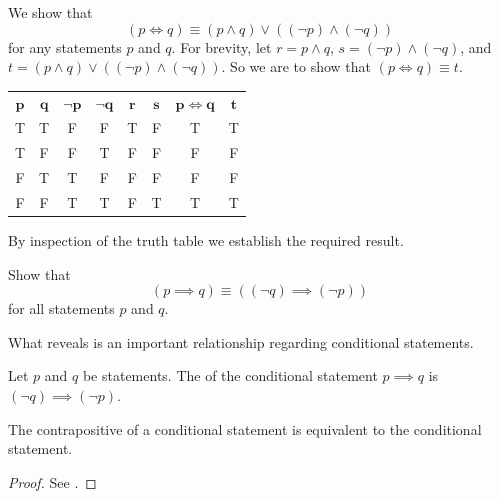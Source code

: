 \begin{example}
    We show that
    \[
        (p \iff q) \equiv (p \land q) \lor ((\lnot p) \land (\lnot q))
    \]
    for any statements $p$ and $q$. For brevity, let $r = p \land q$, $s = (\lnot p) \land (\lnot q)$, and $t = (p \land q) \lor ((\lnot p) \land (\lnot q))$. So we are to show that $(p \iff q) \equiv t$.
    \begin{table}[H]
        \centering
        \begin{tabular}{|c|c||c|c|c|c||c|c|}
            \hline
            $\boldsymbol{p}$ & $\boldsymbol{q}$ & $\boldsymbol{\lnot p}$ & $\boldsymbol{\lnot q}$ & $\boldsymbol{r}$ & $\boldsymbol{s}$ & $\boldsymbol{p \iff q}$ & $\boldsymbol{t}$ \\ \hhline{|=|=#=|=|=|=#=|=|}
            T & T & F & F & T & F & T & T \\ \hline
            T & F & F & T & F & F & F & F \\ \hline
            F & T & T & F & F & F & F & F \\ \hline
            F & F & T & T & F & T & T & T \\ \hline
        \end{tabular}
    \end{table}
    By inspection of the truth table we establish the required result.
\end{example}

\begin{exercise}[Contrapositive]\label{exercise:contrapositive}
    Show that
    \[
        (p \implies q) \equiv ((\lnot q) \implies (\lnot p))
    \]
    for all statements $p$ and $q$. 
\end{exercise}

What  reveals is an important relationship regarding conditional statements.

\begin{definition}[Contrapositive]
    Let $p$ and $q$ be statements. The  of the conditional statement $p \implies q$ is $(\lnot q) \implies (\lnot p)$.
\end{definition}
\begin{proposition}
    The contrapositive of a conditional statement is equivalent to the conditional statement.
\end{proposition}
\begin{proof}
    See .
\end{proof}

